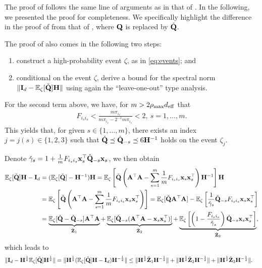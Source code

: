 \documentclass[11pt,a4paper]{article}
\begin{document}
The proof of  follows the same line of arguments as in that of .  
In the following, we presented the proof for completeness.
We specifically highlight the difference in the proof of  from that of , where $\mathbf{Q}$ is replaced by $\check{\mathbf{Q}}$.

The proof of  also comes in the following two steps:
\begin{enumerate}
  \item construct a high-probability event $\zeta$, as in \eqref{eq:events}; and
  \item conditional on the event $\zeta$, derive a bound for the spectral norm $\| \mathbf{I}_d - {\mathbb{E}}_{\zeta} [\check{\mathbf{Q}}] \mathbf{H} \|$ using again the ``leave-one-out'' type analysis.
\end{enumerate}

For the second term above, we have, for  $m>2\rho_{\max} d_{\mathrm{eff}}$ that
\begin{align}\label{eq:F_ii}
    F_{i_si_s}<\frac{m\pi_{i_s}}{ m\pi_{i_s} -2^{-1} m\pi_{i_s} }<2, ~s= 1,\ldots,m.
\end{align} 
This yields that, for given $s\in \{1,\ldots,m\}$, there exists an index $j = j(s) \in \{1, 2, 3\}$ such that $\check{\mathbf{Q}} \preceq \check{\mathbf{Q}}_{-s} \preceq 6\mathbf{H}^{-1}$ holds on the event $\zeta_j$.

Denote $\check \gamma_s=1+\frac{1}{m}F_{i_si_s}\mathbf{x}_s^\top  \check{\mathbf{Q}}_{-s}\mathbf{x}_s$, we then  obtain 
\begin{align}
{\mathbb{E}}_{\zeta}[  \check{\mathbf{Q}} ]\mathbf{H}-\mathbf{I}_d&=({\mathbb{E}}_{\zeta}[  \check{\mathbf{Q}} ]- \mathbf{H}^{-1})\mathbf{H}={\mathbb{E}}_{\zeta}\left[  \check{\mathbf{Q}}\left(\mathbf{A}^\top\mathbf{A}-\sum^m_{s=1}\frac{1}{m}F_{i_si_s}\mathbf{x}_s\mathbf{x}^\top_s\right)\mathbf{H}^{-1}\right] \mathbf{H} \nonumber\\
&={\mathbb{E}}_{\zeta}\left[  \check{\mathbf{Q}}\left( \mathbf{A}^\top\mathbf{A}-\sum^m_{s=1}\frac{1}{m}F_{i_si_s}\mathbf{x}_s\mathbf{x}^\top_s\right)\right]={\mathbb{E}}_{\zeta}[  \check{\mathbf{Q}}\mathbf{A}^\top\mathbf{A}]-{\mathbb{E}}_{\zeta}\left[\frac{1}{\check \gamma_s}  \check{\mathbf{Q}}_{-s}F_{i_si_s}\mathbf{x}_s\mathbf{x}^\top_s\right] \nonumber\\
&=\underbrace{{\mathbb{E}}_{\zeta}[  \check{\mathbf{Q}}-  \check{\mathbf{Q}}_{-s}]\mathbf{A}^\top\mathbf{A}}_{\check{\mathbf{Z}}_1}+\underbrace{{\mathbb{E}}_{\zeta}[  \check{\mathbf{Q}}_{-s}(\mathbf{A}^\top\mathbf{A}-\mathbf{x}_s\mathbf{x}^\top_s)]}_{\check{\mathbf{Z}}_2}  +\underbrace{{\mathbb{E}}_{\zeta}\left[\left(1-\frac{F_{i_si_s}}{\check \gamma_s}\right)  \check{\mathbf{Q}}_{-s}\mathbf{x}_s\mathbf{x}^\top_s    \right]}_{\check{\mathbf{Z}}_3},  \nonumber 
\end{align}
which leads to 
\begin{align}\label{eq:hatbound_rew}
\|\mathbf{I}_d-\mathbf{H}^{\frac{1}{2}}{\mathbb{E}}_{\zeta}[  \check{\mathbf{Q}} ]\mathbf{H}^{\frac{1}{2}}\|=\|\mathbf{H}^{\frac{1}{2}}({\mathbb{E}}_{\zeta}[  \check{\mathbf{Q}} ]\mathbf{H}-\mathbf{I}_d)\mathbf{H}^{-\frac{1}{2}}\|&\leq \|\mathbf{H}^{\frac{1}{2}}\check{\mathbf{Z}}_1\mathbf{H}^{-\frac{1}{2}}\|  +\|\mathbf{H}^{\frac{1}{2}}\check{\mathbf{Z}}_2\mathbf{H}^{-\frac{1}{2}}\|+\|\mathbf{H}^{\frac{1}{2}}\check{\mathbf{Z}}_3\mathbf{H}^{-\frac{1}{2}}\|.
\end{align}
\end{document}
